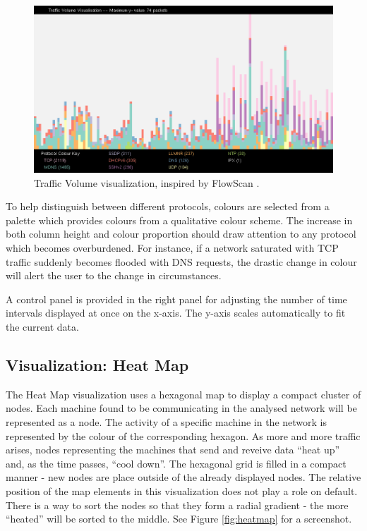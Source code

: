 \begin{figure}[htb]
   \centering
   \includegraphics[width=\linewidth]{materials/traffic-volume.png}
   \caption[Traffic Volume]{\label{fig:traffic-volume}
        Traffic Volume visualization, inspired by FlowScan \cite{plonka2000flowscan}.}
\end{figure}

To help distinguish between different protocols, colours are selected from a palette which provides
colours from a qualitative colour scheme. The increase in both column height and colour proportion
should draw attention to any protocol which becomes overburdened. For instance, if a network
saturated with TCP traffic suddenly becomes flooded with DNS requests, the drastic change in colour
will alert the user to the change in circumstances. 

A control panel is provided in the right panel for adjusting the number of time intervals displayed
at once on the x-axis. The y-axis scales automatically to fit the current data.

\subsection{Visualization: Heat Map}
%
The Heat Map visualization uses a hexagonal map to display a compact cluster of nodes.
Each machine found to be communicating in the analysed network will be represented as a node.
The activity of a specific machine in the network is represented by the colour of the 
corresponding hexagon. As more and more traffic arises, nodes representing the machines that
send and reveive data ``heat up'' and, as the time passes, ``cool down''.
The hexagonal grid is filled in a compact manner - new nodes are place outside of 
the already displayed nodes. The relative position of the map elements in this visualization
does not play a role on default. There is a way to sort the nodes so that they form a radial 
gradient - the more ``heated'' will be sorted to the middle. See Figure \ref{fig:heatmap}
for a screenshot.

